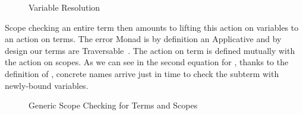 \begin{figure}[h]
\caption{Variable Resolution}
\end{figure}

Scope checking an entire term then amounts to lifting this action on
variables to an action on terms. The error Monad  is by definition
an Applicative and by design our terms are
Traversable~\cite{bird_paterson_1999,DBLP:journals/jfp/GibbonsO09}.
The action on term is defined mutually with the action on scopes.
As we can see in the second equation for , thanks to the
definition of , concrete names arrive just in time to
check the subterm with newly-bound variables.

\begin{figure}[h]
\caption{Generic Scope Checking for Terms and Scopes}
\end{figure}
